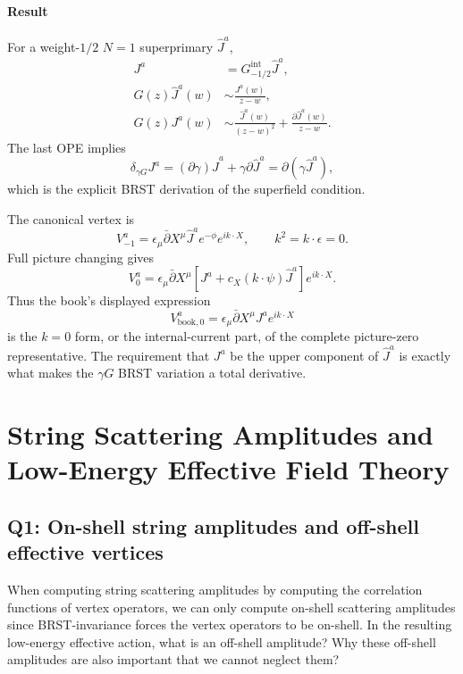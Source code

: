 \documentclass[
  10pt,
  a4paper,
  openany]{book}
\begin{document}
\subsubsection{Result}\label{result-29}

For a weight-\(1/2\) \(N=1\) superprimary \(\hat J^a\), \[
\boxed{
\begin{aligned}
J^a&=G_{-1/2}^{\mathrm{int}}\hat J^a,
\\
G(z)\hat J^a(w)
&\sim
\frac{J^a(w)}{z-w},
\\
G(z)J^a(w)
&\sim
\frac{\hat J^a(w)}{(z-w)^2}
+
\frac{\partial\hat J^a(w)}{z-w}.
\end{aligned}
}
\] The last OPE implies \[
\boxed{
\delta_{\gamma G}J^a
=
(\partial\gamma)\hat J^a
+\gamma\partial\hat J^a
=
\partial(\gamma\hat J^a),
}
\] which is the explicit BRST derivation of the superfield condition.

The canonical vertex is \[
\boxed{
V_{-1}^a
=
\epsilon_\mu\bar\partial X^\mu
\hat J^a e^{-\phi}e^{ik\cdot X},
\qquad
k^2=k\cdot\epsilon=0.
}
\] Full picture changing gives \[
\boxed{
V_0^a
=
\epsilon_\mu\bar\partial X^\mu
\left[
J^a+c_X(k\cdot\psi)\hat J^a
\right]e^{ik\cdot X}.
}
\] Thus the book's displayed expression \[
V_{\mathrm{book},0}^a
=
\epsilon_\mu\bar\partial X^\mu J^a e^{ik\cdot X}
\] is the \(k=0\) form, or the internal-current part, of the complete
picture-zero representative. The requirement that \(J^a\) be the upper
component of \(\hat J^a\) is exactly what makes the \(\gamma G\) BRST
variation a total derivative.

\chapter{String Scattering Amplitudes and Low-Energy Effective Field
Theory}\label{string-scattering-amplitudes-and-low-energy-effective-field-theory-1}

\section{Q1: On-shell string amplitudes and off-shell effective
vertices}\label{q1-on-shell-string-amplitudes-and-off-shell-effective-vertices}

When computing string scattering amplitudes by computing the correlation
functions of vertex operators, we can only compute on-shell scattering
amplitudes since BRST-invariance forces the vertex operators to be
on-shell. In the resulting low-energy effective action, what is an
off-shell amplitude? Why these off-shell amplitudes are also important
that we cannot neglect them?
\end{document}
